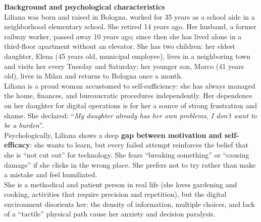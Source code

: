 ﻿\documentclass[11pt,a4paper]{article}
\begin{document}
\begin{tcolorbox}[base]
    \textbf{Background and psychological characteristics} \\[4pt]
    {\small
    Liliana was born and raised in Bologna, worked for 35 years as a school aide in a neighborhood elementary school. She retired 14 years ago. Her husband, a former railway worker, passed away 10 years ago; since then she has lived alone in a third-floor apartment without an elevator. She has two children: her eldest daughter, Elena (45 years old, municipal employee), lives in a neighboring town and visits her every Tuesday and Saturday; her younger son, Marco (41 years old), lives in Milan and returns to Bologna once a month. \\[4pt]

    Liliana is a proud woman accustomed to self-sufficiency: she has always managed the home, finances, and bureaucratic procedures independently. Her dependence on her daughter for digital operations is for her a source of strong frustration and shame. She declared: ``\textit{My daughter already has her own problems, I don't want to be a burden}''. \\[4pt]

    Psychologically, Liliana shows a deep \textbf{gap between motivation and self-efficacy}: she wants to learn, but every failed attempt reinforces the belief that she is ``not cut out'' for technology. She fears ``breaking something'' or ``causing damage'' if she clicks in the wrong place. She prefers not to try rather than make a mistake and feel humiliated. \\[4pt]

    She is a methodical and patient person in real life (she loves gardening and cooking, activities that require precision and repetition), but the digital environment disorients her: the density of information, multiple choices, and lack of a ``tactile'' physical path cause her anxiety and decision paralysis.
    }
\end{tcolorbox}

\vspace{0.3cm}

\end{document}
